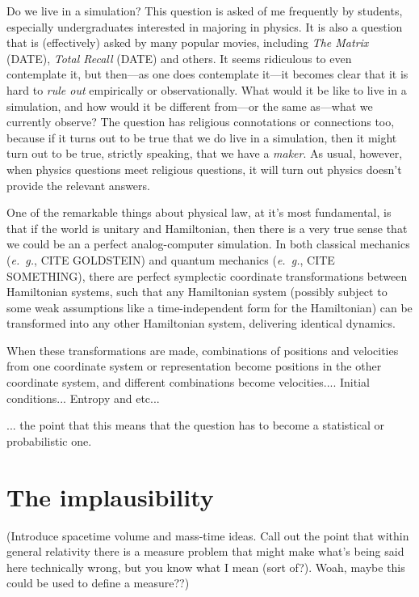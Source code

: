 \documentclass[12pt,letterpaper]{article}
\newcommand{\foreign}[1]{\textsl{#1}}
\newcommand{\eg}{\foreign{e.~g.}}
\begin{document}
Do we live in a simulation? This question is asked of me frequently by
students, especially undergraduates interested in majoring in physics.
It is also a question that is (effectively) asked by many popular
movies, including \textit{The Matrix} (DATE), \textit{Total Recall}
(DATE) and others.
It seems ridiculous to even contemplate it, but then---as one does
contemplate it---it becomes clear that it is hard to \emph{rule out}
empirically or observationally.
What would it be like to live in a simulation, and how would it be
different from---or the same as---what we currently observe?
The question has religious connotations or connections too, because if
it turns out to be true that we do live in a simulation, then it might
turn out to be true, strictly speaking, that we have a \emph{maker}.
As usual, however, when physics questions meet religious questions, it
will turn out
physics doesn't provide the relevant answers.

One of the remarkable things about physical law, at it's most fundamental,
is that if the world is unitary and Hamiltonian, then there is a very
true sense that we could be an a perfect analog-computer simulation.
In both classical mechanics (\eg, CITE GOLDSTEIN) and quantum mechanics
(\eg, CITE SOMETHING), there are perfect symplectic coordinate transformations
between Hamiltonian systems, such that any Hamiltonian system (possibly subject
to some weak assumptions like a time-independent form for the Hamiltonian)
can be transformed into any other Hamiltonian system, delivering identical
dynamics.

When these transformations are made, combinations of positions and
velocities from one coordinate system or representation become
positions in the other coordinate system, and different combinations
become velocities....
Initial conditions...
Entropy and etc...

... the point that this means that the question has to become a
statistical or probabilistic one.

\section{The implausibility}

(Introduce spacetime volume and mass-time ideas. Call out the point
that within general relativity there is a measure problem that might
make what's being said here technically wrong, but you know what I
mean (sort of?). Woah, maybe this could be used to define a measure??)
\end{document}
